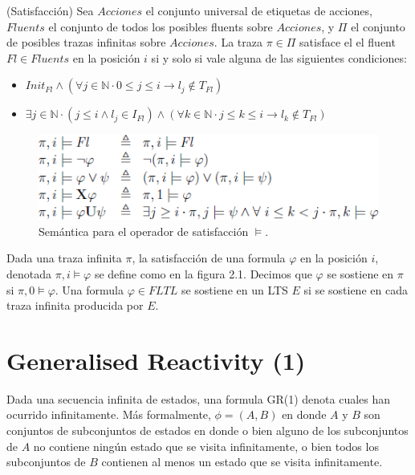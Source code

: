 \begin{definition}{(Satisfacción)}
Sea $Acciones$ el conjunto universal de etiquetas de acciones, $Fluents$ el conjunto de todos los posibles fluents sobre $Acciones$,
y $\Pi$ el conjunto de posibles trazas infinitas sobre $Acciones$. La traza $\pi \in \Pi$ satisface el el fluent $Fl \in Fluents$ en
la posición $i$ si y solo si vale alguna de las siguientes condiciones:

\begin{itemize}

\item
$Init_{Fl} \land (\forall j \in \mathbb{N} \cdot 0 \leq j \leq i \rightarrow l_{j} \notin T_{Fl})$

\item
$\exists j \in \mathbb{N} \cdot (j \leq i \land l_{j} \in I_{Fl}) \land (\forall k \in \mathbb{N} \cdot j \leq k \leq i \rightarrow 	l_{k} \notin T_{Fl})$

\end{itemize}

\begin{figure}[H]
	\centering
		\includegraphics{Imagenes/Otros/ltl.png}
	\caption{Semántica para el operador de satisfacción $\vDash$.}
	\label{fig:ltl}
\end{figure}

Dada una traza infinita $\pi$, la satisfacción de una formula $\varphi$ en la posición $i$, denotada $\pi, i\vDash \varphi$ se define como en la figura 2.1.
Decimos que $\varphi$ se sostiene en $\pi$ si $\pi, 0\vDash \varphi$. Una formula $\varphi \in FLTL$ se sostiene en un LTS $E$ si se sostiene en cada traza
infinita producida por $E$.

\end{definition}


\section{Generalised Reactivity (1)}

Dada una secuencia infinita de estados, una formula GR(1) denota cuales han ocurrido infinitamente. 
Más formalmente, $\phi = (A, B)$ en donde $A$ y $B$ son conjuntos de subconjuntos de estados en donde o bien alguno de los
subconjuntos de $A$ no contiene ningún estado que se visita infinitamente, o bien todos los subconjuntos de $B$ contienen 
al menos un estado que se visita infinitamente.

